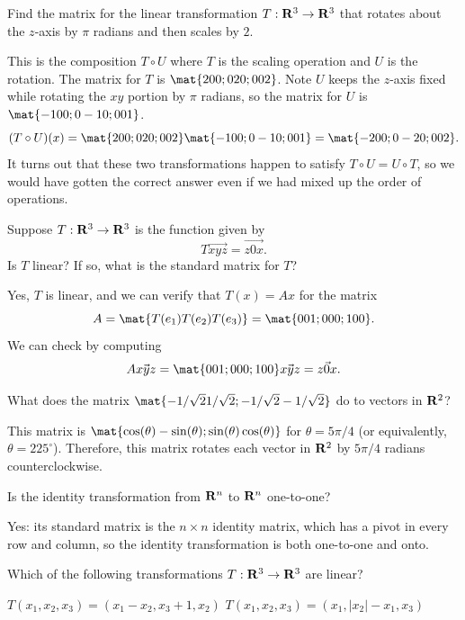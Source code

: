 \begin{problems}
\problem %
Find the matrix for the linear transformation $T: {\bf R}^3 \to {\bf R}^3$ that
rotates about the $z$-axis by $\pi$ radians and then scales by $2$.

\begin{solution}
  This is the composition $T \circ U$ where $T$ is the scaling operation and $U$
  is the rotation.  The matrix for $T$ is $\mat{2 0 0; 0 2 0; 0 0 2}$.  Note $U$
  keeps the $z$-axis fixed while rotating the $xy$ portion by $\pi$ radians, so
  the matrix for $U$ is $\mat{-1 0 0; 0 -1 0; 0 0 1}$.
  \[(T \circ U)(x) = \mat{2 0 0; 0 2 0; 0 0 2} \mat{-1 0 0; 0 -1 0; 0 0 1} =
    \mat{-2 0 0; 0 -2 0; 0 0 2}.\] It turns out that these two transformations
  happen to satisfy $T \circ U = U \circ T$, so we would have gotten the correct
  answer even if we had mixed up the order of operations.
\end{solution}

\problem %
Suppose $T: {\bf R}^3 \to {\bf R}^3$ is the function given by
\[T \vec{x y z} = \vec{z 0 x}.\] Is $T$ linear?  If so, what is the standard
matrix for $T$?

\begin{solution}
Yes, $T$ is linear, and we can verify that $T(x) = Ax$ for the matrix
\[A = \mat{T(e_1) T(e_2) T(e_3)} = \mat{0 0 1; 0 0 0; 1 0 0}.\]
We can check by computing
\[A \vec{x y z} = \mat{0 0 1; 0 0 0; 1 0 0}\vec{x y z}
= \vec{z 0 x}.\]
\end{solution}


\problem %
What does the matrix 
$\mat{-1/\sqrt{2} 1/\sqrt{2}; -1/\sqrt{2} -1/\sqrt{2}}$ 
do to vectors in ${\bf R}^2$?

\begin{solution}
  This matrix is $\mat{\cos(\theta) -\sin(\theta); \sin(\theta) \cos(\theta)}$
  for $\theta = 5\pi/4$ (or equivalently, $\theta = 225^\circ$).  Therefore,
  this matrix rotates each vector in ${\bf R}^2$ by $5\pi/4$ radians
  counterclockwise.
\end{solution}

\problem Is the identity transformation from ${\bf R}^n$ to ${\bf R}^n$ one-to-one?

\begin{solution}
  Yes: its standard matrix is the $n \times n$ identity matrix, which has a
  pivot in every row and column, so the identity transformation is both
  one-to-one and onto.
\end{solution}

\problem Which of the following transformations $T: {\bf R}^3
\to {\bf R}^3$ are linear?
\begin{subproblems}
  \subproblem $T(x_1, x_2, x_3) = (x_1-x_2, x_3 + 1, x_2)$ %
  \subproblem $T(x_1, x_2, x_3) = (x_1, |x_2|-x_1, x_3)$ %
\end{subproblems}


\end{problems}
